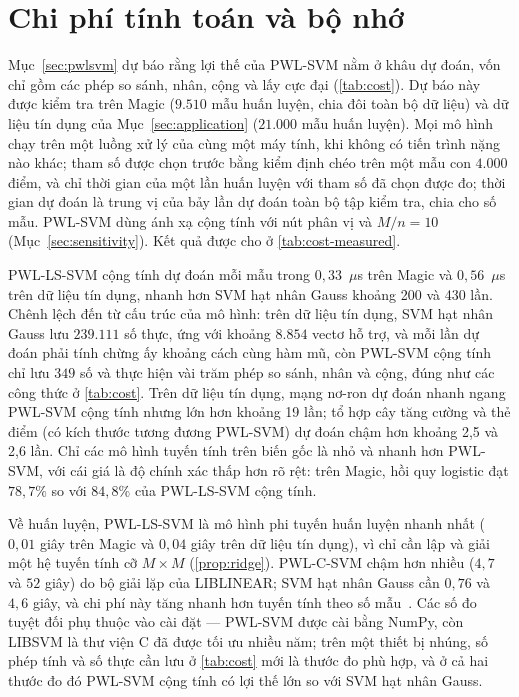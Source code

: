 \section{Chi phí tính toán và bộ nhớ}\label{sec:cost}

Mục~\ref{sec:pwlsvm} dự báo rằng lợi thế của PWL-SVM nằm ở khâu dự đoán, vốn chỉ gồm các phép so sánh, nhân, cộng và lấy cực đại (\cref{tab:cost}). Dự báo này được kiểm tra trên Magic ($9.510$ mẫu huấn luyện, chia đôi toàn bộ dữ liệu) và dữ liệu tín dụng của Mục~\ref{sec:application} ($21.000$ mẫu huấn luyện). Mọi mô hình chạy trên một luồng xử lý của cùng một máy tính, khi không có tiến trình nặng nào khác; tham số được chọn trước bằng kiểm định chéo trên một mẫu con $4.000$ điểm, và chỉ thời gian của một lần huấn luyện với tham số đã chọn được đo; thời gian dự đoán là trung vị của bảy lần dự đoán toàn bộ tập kiểm tra, chia cho số mẫu. PWL-SVM dùng ánh xạ cộng tính với nút phân vị và $M/n=10$ (Mục~\ref{sec:sensitivity}). Kết quả được cho ở \cref{tab:cost-measured}.



PWL-LS-SVM cộng tính dự đoán mỗi mẫu trong $0{,}33$~$\mu$s trên Magic và $0{,}56$~$\mu$s trên dữ liệu tín dụng, nhanh hơn SVM hạt nhân Gauss khoảng 200 và 430 lần. Chênh lệch đến từ cấu trúc của mô hình: trên dữ liệu tín dụng, SVM hạt nhân Gauss lưu $239.111$ số thực, ứng với khoảng $8.854$ vectơ hỗ trợ, và mỗi lần dự đoán phải tính chừng ấy khoảng cách cùng hàm mũ, còn PWL-SVM cộng tính chỉ lưu $349$ số và thực hiện vài trăm phép so sánh, nhân và cộng, đúng như các công thức ở \cref{tab:cost}. Trên dữ liệu tín dụng, mạng nơ-ron dự đoán nhanh ngang PWL-SVM cộng tính nhưng lớn hơn khoảng 19 lần; tổ hợp cây tăng cường và thẻ điểm (có kích thước tương đương PWL-SVM) dự đoán chậm hơn khoảng 2{,}5 và 2{,}6 lần. Chỉ các mô hình tuyến tính trên biến gốc là nhỏ và nhanh hơn PWL-SVM, với cái giá là độ chính xác thấp hơn rõ rệt: trên Magic, hồi quy logistic đạt $78{,}7\%$ so với $84{,}8\%$ của PWL-LS-SVM cộng tính.

Về huấn luyện, PWL-LS-SVM là mô hình phi tuyến huấn luyện nhanh nhất ($0{,}01$ giây trên Magic và $0{,}04$ giây trên dữ liệu tín dụng), vì chỉ cần lập và giải một hệ tuyến tính cỡ $M\times M$ (\cref{prop:ridge}). PWL-C-SVM chậm hơn nhiều ($4{,}7$ và $52$ giây) do bộ giải lặp của LIBLINEAR; SVM hạt nhân Gauss cần $0{,}76$ và $4{,}6$ giây, và chi phí này tăng nhanh hơn tuyến tính theo số mẫu~\cite{chang2011}. Các số đo tuyệt đối phụ thuộc vào cài đặt --- PWL-SVM được cài bằng NumPy, còn LIBSVM là thư viện C đã được tối ưu nhiều năm; trên một thiết bị nhúng, số phép tính và số thực cần lưu ở \cref{tab:cost} mới là thước đo phù hợp, và ở cả hai thước đo đó PWL-SVM cộng tính có lợi thế lớn so với SVM hạt nhân Gauss.

